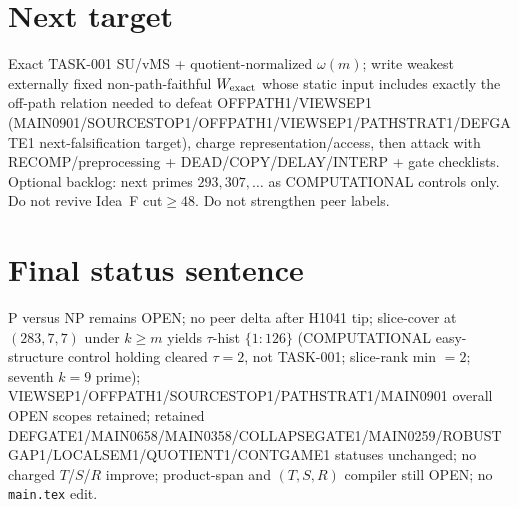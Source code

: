 \documentclass[11pt]{article}
\begin{document}
\section*{Next target}
Exact TASK-001 SU/vMS + quotient-normalized $\omega(m)$; write weakest externally fixed non-path-faithful
$W_{\rm exact}$ whose static input includes exactly the off-path relation needed to defeat OFFPATH1/VIEWSEP1
(MAIN0901/SOURCESTOP1/OFFPATH1/VIEWSEP1/PATHSTRAT1/DEFGATE1 next-falsification target), charge representation/access,
then attack with RECOMP/preprocessing + DEAD/COPY/DELAY/INTERP + gate checklists.
Optional backlog: next primes $293,307,\ldots$ as COMPUTATIONAL controls only.
Do not revive Idea~F cut$\ge48$. Do not strengthen peer labels.

\section*{Final status sentence}
P versus NP remains OPEN; no peer delta after H1041 tip; slice-cover at $(283,7,7)$ under $k{\ge}m$ yields $\tau$-hist $\{1{:}126\}$ (COMPUTATIONAL easy-structure control holding cleared $\tau{=}2$, not TASK-001; slice-rank min $=2$; seventh $k{=}9$ prime); VIEWSEP1/OFFPATH1/SOURCESTOP1/PATHSTRAT1/MAIN0901 overall OPEN scopes retained; retained DEFGATE1/MAIN0658/MAIN0358/COLLAPSEGATE1/MAIN0259/ROBUSTGAP1/LOCALSEM1/QUOTIENT1/CONTGAME1 statuses unchanged; no charged $T$/$S$/$R$ improve; product-span and $(T,S,R)$ compiler still OPEN; no \texttt{main.tex} edit.
\end{document}
